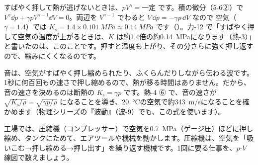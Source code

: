 すばやく押して熱が逃げないときは、$pV^\gamma=$一定 です。積の微分（5-6②）で $V^\gamma\dd p+\gamma pV^{\gamma-1}\dd V=0$。両辺を $V^{\gamma-1}$ でわると $V\,\dd p=-\gamma p\,\dd V$ なので
\label{ph:熱-3:Ks}空気（$\gamma=1.4$）では $K_{\mathrm s}=1.4\times\qty{0.101}{MPa}\approx\qty{0.14}{MPa}$ です（）。力-12 で「すばやく押して空気の温度が上がるときは、$K$ は約1.4倍の約\qty{0.14}{MPa}になります（熱-3）」と書いたのは、このことです。押すと温度も上がり、その分さらに強く押し返すので、縮みにくくなるのです。

\begin{phmijika}[音が伝わるとき]
音は、空気がすばやく押し縮められたり、ふくらんだりしながら伝わる波です。1秒に何百回もの速さで押し縮めるので、熱が移る時間はありません。だから、音の速さを決めるのは断熱の $K_{\mathrm s}=\gamma p$ です。熱-4 ⑥ で、音の速さが $\sqrt{K_{\mathrm s}/\rho}=\sqrt{\gamma p/\rho}$ になることを導き、\qty{20}{\celsius}の空気で約\qty{343}{m/s}になることを確かめます（物理シリーズの『波動』（波-9）でも、この式を使います）。
\end{phmijika}


\leavevmode\label{ph:熱-3:sec9}工場では、圧縮機（コンプレッサー）で空気を\qty{0.7}{MPa}（ゲージ圧）ほどに押し縮め、タンクにためて、エアツールや機械を動かします。圧縮機は、空気を「吸いこむ→押し縮める→押し出す」を繰り返す機械です。1回に要る仕事を、$p$-$V$ 線図で数えましょう。

